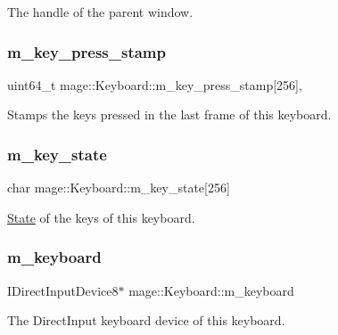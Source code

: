 The handle of the parent window. \hypertarget{classmage_1_1_keyboard_a8eb4ce7e4e2395bb27d2ac9236655335}{}\label{classmage_1_1_keyboard_a8eb4ce7e4e2395bb27d2ac9236655335} 
\subsubsection{\texorpdfstring{m\+\_\+key\+\_\+press\+\_\+stamp}{m\_key\_press\_stamp}}
{\footnotesize\ttfamily uint64\+\_\+t mage\+::\+Keyboard\+::m\+\_\+key\+\_\+press\+\_\+stamp\mbox{[}256\mbox{]}\hspace{0.3cm}{\ttfamily [mutable]}, {\ttfamily [protected]}}

Stamps the keys pressed in the last frame of this keyboard. \hypertarget{classmage_1_1_keyboard_ad3361790f2c9cc5ca19161f0c8e24acd}{}\label{classmage_1_1_keyboard_ad3361790f2c9cc5ca19161f0c8e24acd} 
\subsubsection{\texorpdfstring{m\+\_\+key\+\_\+state}{m\_key\_state}}
{\footnotesize\ttfamily char mage\+::\+Keyboard\+::m\+\_\+key\+\_\+state\mbox{[}256\mbox{]}\hspace{0.3cm}{\ttfamily [protected]}}

\hyperlink{classmage_1_1_state}{State} of the keys of this keyboard. \hypertarget{classmage_1_1_keyboard_ae1325369d4863cc36ec1a0359dbf27fb}{}\label{classmage_1_1_keyboard_ae1325369d4863cc36ec1a0359dbf27fb} 
\subsubsection{\texorpdfstring{m\+\_\+keyboard}{m\_keyboard}}
{\footnotesize\ttfamily I\+Direct\+Input\+Device8$\ast$ mage\+::\+Keyboard\+::m\+\_\+keyboard\hspace{0.3cm}{\ttfamily [protected]}}

The Direct\+Input keyboard device of this keyboard.

